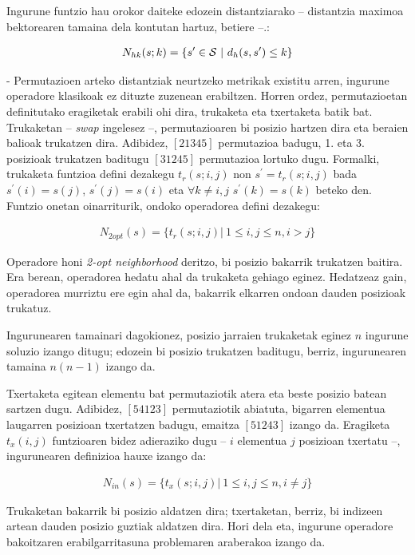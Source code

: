 \documentclass[eu]{ifirak}\usepackage[]{graphicx}\usepackage[]{color}
\begin{document}
Ingurune funtzio hau orokor daiteke edozein distantziarako -- distantzia maximoa bektorearen tamaina dela kontutan hartuz, betiere  --.:

\begin{align}
N_{hk}(s;k) = \{s^\prime\in {\cal S}\ |\ d_h(s,s^\prime) \leq k\}
\end{align}

 - Permutazioen arteko distantziak neurtzeko metrikak existitu arren, ingurune operadore klasikoak ez dituzte zuzenean erabiltzen. Horren ordez, permutazioetan definitutako eragiketak erabili ohi dira, trukaketa eta txertaketa batik bat. Trukaketan -- \textit{swap} ingelesez --, permutazioaren bi posizio hartzen dira eta beraien balioak trukatzen dira. Adibidez, $[21345]$ permutazioa badugu, 1. eta 3. posizioak trukatzen baditugu $[31245]$ permutazioa lortuko dugu. Formalki, trukaketa funtzioa defini dezakegu $t_r(s;i,j)$ non $s^\prime = t_r(s;i,j)$ bada $s^\prime(i)=s(j)$, $s^\prime(j)=s(i)$ eta $\forall k\neq i,j$ $s^\prime(k)=s(k)$ beteko den. Funtzio onetan oinarriturik, ondoko operadorea defini dezakegu:

\begin{align}
N_{2opt}(s) = \{t_r(s;i,j)|\ 1 \leq i,j\leq n, i > j\}
\end{align}

Operadore honi \textit{2-opt neighborhood} deritzo, bi posizio bakarrik trukatzen baitira. Era berean, operadorea hedatu ahal da trukaketa gehiago eginez. Hedatzeaz gain, operadorea murriztu ere egin ahal da, bakarrik elkarren ondoan dauden posizioak trukatuz.

Ingurunearen tamainari dagokionez, posizio jarraien trukaketak eginez $n$ ingurune soluzio izango ditugu; edozein bi posizio trukatzen baditugu, berriz, ingurunearen tamaina $n(n-1)$ izango da.

Txertaketa egitean elementu bat permutaziotik atera eta beste posizio batean sartzen dugu. Adibidez, $[54123]$ permutaziotik abiatuta, bigarren elementua laugarren posizioan txertatzen badugu, emaitza $[51243]$ izango da. Eragiketa $t_x(i,j)$ funtzioaren bidez adieraziko dugu -- $i$ elementua $j$ posizioan txertatu --, ingurunearen definizioa hauxe izango da:

\begin{align}
N_{in}(s) = \{t_x(s;i,j)|\ 1 \leq i,j\leq n, i \neq j\}
\end{align}

Trukaketan bakarrik bi posizio aldatzen dira; txertaketan, berriz, bi indizeen artean dauden posizio guztiak aldatzen dira. Hori dela eta, ingurune operadore bakoitzaren erabilgarritasuna problemaren araberakoa izango da. 
\end{document}
